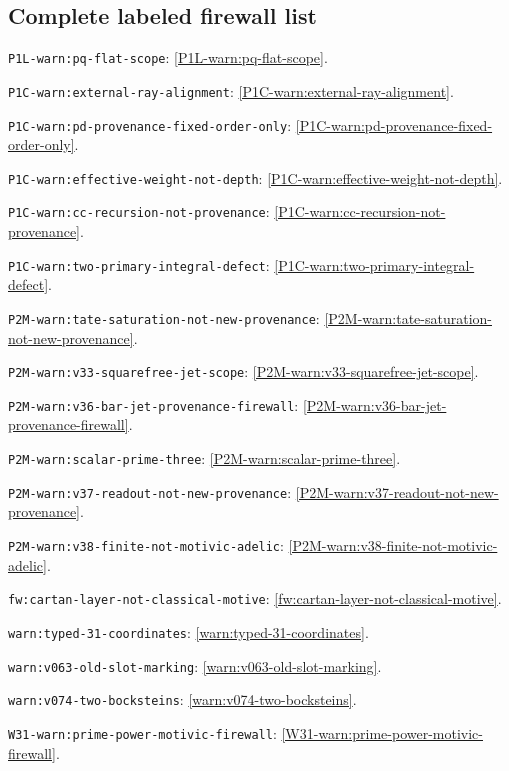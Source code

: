 \documentclass[11pt]{article}
\theoremstyle{remark}
\begin{document}
\subsection*{Complete labeled firewall list}
\begingroup
\setlength{\parskip}{0.15em}
\noindent \nolinkurl{P1L-warn:pq-flat-scope}: \cref{P1L-warn:pq-flat-scope}.\par
\noindent \nolinkurl{P1C-warn:external-ray-alignment}: \cref{P1C-warn:external-ray-alignment}.\par
\noindent \nolinkurl{P1C-warn:pd-provenance-fixed-order-only}: \cref{P1C-warn:pd-provenance-fixed-order-only}.\par
\noindent \nolinkurl{P1C-warn:effective-weight-not-depth}: \cref{P1C-warn:effective-weight-not-depth}.\par
\noindent \nolinkurl{P1C-warn:cc-recursion-not-provenance}: \cref{P1C-warn:cc-recursion-not-provenance}.\par
\noindent \nolinkurl{P1C-warn:two-primary-integral-defect}: \cref{P1C-warn:two-primary-integral-defect}.\par
\noindent \nolinkurl{P2M-warn:tate-saturation-not-new-provenance}: \cref{P2M-warn:tate-saturation-not-new-provenance}.\par
\noindent \nolinkurl{P2M-warn:v33-squarefree-jet-scope}: \cref{P2M-warn:v33-squarefree-jet-scope}.\par
\noindent \nolinkurl{P2M-warn:v36-bar-jet-provenance-firewall}: \cref{P2M-warn:v36-bar-jet-provenance-firewall}.\par
\noindent \nolinkurl{P2M-warn:scalar-prime-three}: \cref{P2M-warn:scalar-prime-three}.\par
\noindent \nolinkurl{P2M-warn:v37-readout-not-new-provenance}: \cref{P2M-warn:v37-readout-not-new-provenance}.\par
\noindent \nolinkurl{P2M-warn:v38-finite-not-motivic-adelic}: \cref{P2M-warn:v38-finite-not-motivic-adelic}.\par
\noindent \nolinkurl{fw:cartan-layer-not-classical-motive}: \cref{fw:cartan-layer-not-classical-motive}.\par
\noindent \nolinkurl{warn:typed-31-coordinates}: \cref{warn:typed-31-coordinates}.\par
\noindent \nolinkurl{warn:v063-old-slot-marking}: \cref{warn:v063-old-slot-marking}.\par
\noindent \nolinkurl{warn:v074-two-bocksteins}: \cref{warn:v074-two-bocksteins}.\par
\noindent \nolinkurl{W31-warn:prime-power-motivic-firewall}: \cref{W31-warn:prime-power-motivic-firewall}.\par
\endgroup
\end{document}
